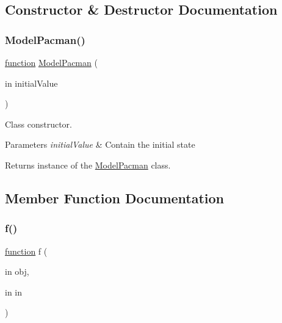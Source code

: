 \subsection{Constructor \& Destructor Documentation}
\mbox{\label{class_model_pacman_aeece945de8fe29ca408290f87392ac3d}} 
\subsubsection{\texorpdfstring{Model\+Pacman()}{ModelPacman()}}
{\footnotesize\ttfamily \hyperlink{_plan__desuma_functions__2_players_8m_ac2ffb26d6f42d3bbcd7847b0873403f4}{function} \hyperlink{class_model_pacman}{Model\+Pacman} (\begin{DoxyParamCaption}\item[{in}]{initial\+Value }\end{DoxyParamCaption})}



Class constructor. 


\begin{DoxyParams}{Parameters}
{\em initial\+Value} & Contain the initial state \\
\hline
\end{DoxyParams}
\begin{DoxyReturn}{Returns}
instance of the \hyperlink{class_model_pacman}{Model\+Pacman} class. 
\end{DoxyReturn}


\subsection{Member Function Documentation}
\mbox{\label{class_model_pacman_a6f3b146c92a207e95690d08975e1e072}} 
\subsubsection{\texorpdfstring{f()}{f()}}
{\footnotesize\ttfamily \hyperlink{_plan__desuma_functions__2_players_8m_ac2ffb26d6f42d3bbcd7847b0873403f4}{function} f (\begin{DoxyParamCaption}\item[{in}]{obj,  }\item[{in}]{in }\end{DoxyParamCaption})\hspace{0.3cm}{\ttfamily [virtual]}}



